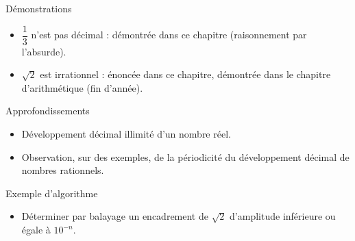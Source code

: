 \documentclass{article}
\theoremstyle{definition}
\begin{document}
\begin{paragraph}{Démonstrations}
    \begin{itemize}
        \item $\dfrac{1}{3}$ n'est pas décimal : démontrée dans ce chapitre (raisonnement par l'absurde).
        \item $\sqrt{2}$ est irrationnel : énoncée dans ce chapitre, démontrée dans le chapitre d'arithmétique (fin d'année).
    \end{itemize}
\end{paragraph}

\begin{paragraph}{Approfondissements}
    \begin{itemize}
        \item Développement décimal illimité d'un nombre réel.
        \item Observation, sur des exemples, de la périodicité du développement décimal de nombres rationnels.
    \end{itemize}
\end{paragraph}

\begin{paragraph}{Exemple d'algorithme}
    \begin{itemize}
        \item Déterminer par balayage un encadrement de $\sqrt{2}$ d'amplitude inférieure ou égale à $10^{-n}$.
    \end{itemize}
\end{paragraph}
\end{document}
